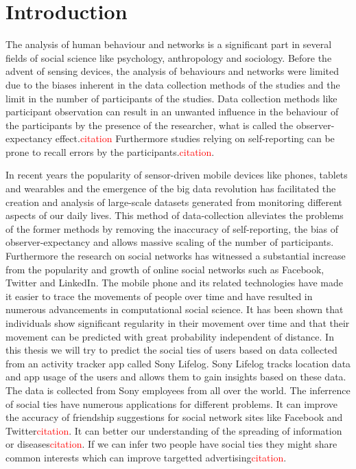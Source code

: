 \section{Introduction}
The analysis of human behaviour and networks is a significant part in several fields of social science like psychology, anthropology and sociology. Before the advent of sensing devices, the analysis of behaviours and networks were limited due to the biases inherent in the data collection methods of the studies and the limit in the number of participants of the studies. Data collection methods like participant observation can result in an unwanted influence in the behaviour of the participants by the presence of the researcher, what is called the observer-expectancy effect.\textcolor{red}{citation} Furthermore studies relying on self-reporting can be prone to recall errors by the participants.\textcolor{red}{citation}.

In recent years the popularity of sensor-driven mobile devices like phones, tablets and wearables and the emergence of the big data revolution has facilitated the creation and analysis of large-scale datasets generated from monitoring different aspects of our daily lives\cite{lazer2009life}. This method of data-collection alleviates the problems of the former methods by removing the inaccuracy of self-reporting, the bias of observer-expectancy and allows massive scaling of the number of participants. Furthermore the research on social networks has witnessed a substantial increase from the popularity and growth of online social networks such as Facebook, Twitter and LinkedIn\cite{social_networks}. The mobile phone and its related technologies have made it easier to trace the movements of people over time and have resulted in numerous advancements in computational social science. It has been shown that individuals show significant regularity in their movement over time\cite{Uihmp} and that their movement can be predicted with great probability independent of distance\cite{LoPiHM}. In this thesis we will try to predict the social ties of users based on data collected from an activity tracker app called Sony Lifelog\cite{sonyLifeLog}. Sony Lifelog tracks location data and app usage of the users and allows them to gain insights based on these data. The data is collected from Sony employees from all over the world.
The inferrence of social ties have numerous applications for different problems. It can improve the accuracy of friendship suggestions for social network sites like Facebook and Twitter\textcolor{red}{citation}. It can better our understanding of the spreading of information or diseases\textcolor{red}{citation}. If we can infer two people have social ties they might share common interests which can improve targetted advertising\textcolor{red}{citation}.

